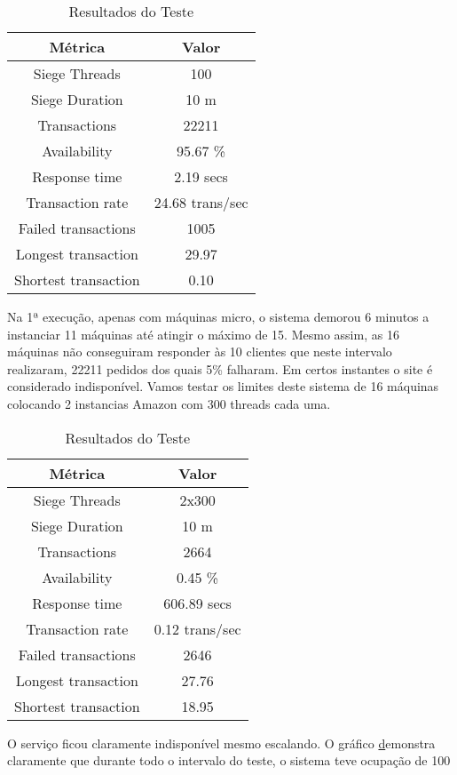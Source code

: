 \begin{table}[ht]
\centering
\begin{tabular}{| c | c |}
    \hline
    {\bf Métrica} &  {\bf Valor} \\ \hline
	Siege  Threads 		&  100  \\ \hline
	Siege  Duration 	&  10 m \\ \hline\hline
	Transactions 		&  22211 \\ \hline
	Availability 		&  95.67 \% \\ \hline
	Response time 		&  2.19 secs  \\ \hline
	Transaction rate 	&  24.68 trans/sec \\ \hline
	Failed transactions &  1005 \\ \hline
	Longest transaction &  29.97 \\ \hline
	Shortest transaction &  0.10 \\ \hline
  \end{tabular}
\caption{Resultados do Teste}
\end{table}


Na 1ª execução, apenas com máquinas micro, o sistema demorou 6 minutos a instanciar 11 máquinas até atingir o máximo de 15. Mesmo assim, as 16 máquinas não conseguiram responder às 10 clientes que neste intervalo realizaram, 22211 pedidos dos quais 5\% falharam. Em certos instantes o site é considerado indisponível. 
Vamos testar os limites deste sistema de 16 máquinas colocando 2 instancias Amazon com 300 threads cada uma. 

\begin{table}[ht]
\centering
\begin{tabular}{| c | c |}
    \hline
    {\bf Métrica} &  {\bf Valor} \\ \hline
	Siege  Threads 		&  2x300  \\ \hline
	Siege  Duration 	&  10 m \\ \hline\hline
	Transactions 		& 2664  \\ \hline
	Availability 		&  0.45 \% \\ \hline
	Response time 		&  606.89 secs  \\ \hline
	Transaction rate 	&  0.12 trans/sec \\ \hline
	Failed transactions &  2646 \\ \hline
	Longest transaction &  27.76 \\ \hline
	Shortest transaction &  18.95 \\ \hline
  \end{tabular}
\caption{Resultados do Teste}
\end{table}
O serviço ficou claramente indisponível mesmo escalando. O gráfico \href{fig:teste2CPU} demonstra claramente que durante todo o intervalo do teste, o sistema teve ocupação de 100%

